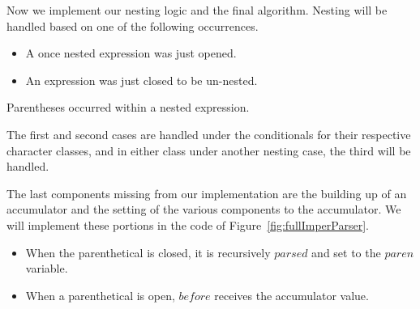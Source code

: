 Now we implement our nesting logic and the final algorithm. Nesting will be handled 
based on one of the following occurrences.

\begin{itemize}
  \item A once nested expression was just opened.
  \item An expression was just closed to be un-nested.
\end{itemize}
 Parentheses occurred within a nested expression.

The first and second cases are handled under the conditionals for their respective 
character classes, and in either class under another nesting case, the third will be 
handled.

The last components missing from our implementation are the building up of an 
accumulator and the setting of the various components to the accumulator. We will 
implement these portions in the code of Figure~\ref{fig:fullImperParser}.

\begin{itemize}
  \item When the parenthetical is closed, it is recursively $parsed$ and set to the $paren$ variable.
  \item When a parenthetical is open, $before$ receives the accumulator value.
\end{itemize}

